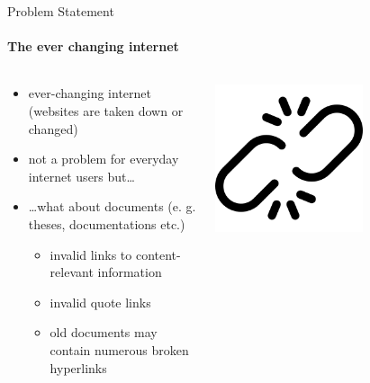 \documentclass[
    ngerman,%
    authorontitle=true,
]{bfhbeamer}
\begin{document}
    \begin{frame}{Problem Statement}
        \framesubtitle{The ever changing internet}
        \begin{columns} %
            \begin{column}{0.6\textwidth} %
                \begin{itemize}
                    \item ever-changing internet (websites are taken down or changed)
                    \item not a problem for everyday internet users but\ldots
                    \item \ldots what about documents (e. g. theses, documentations etc.)
                    \begin{itemize}
                        \item invalid links to content-relevant information
                        \item invalid quote links
                        \item old documents may contain numerous broken hyperlinks
                    \end{itemize}
                \end{itemize}
            \end{column}
            \begin{column}{0.3\textwidth} %
                \begin{center}
                    \includegraphics[width=0.6\textwidth]{pictures/broken_link}
                \end{center}
            \end{column}
        \end{columns}
    \end{frame}
\end{document}
